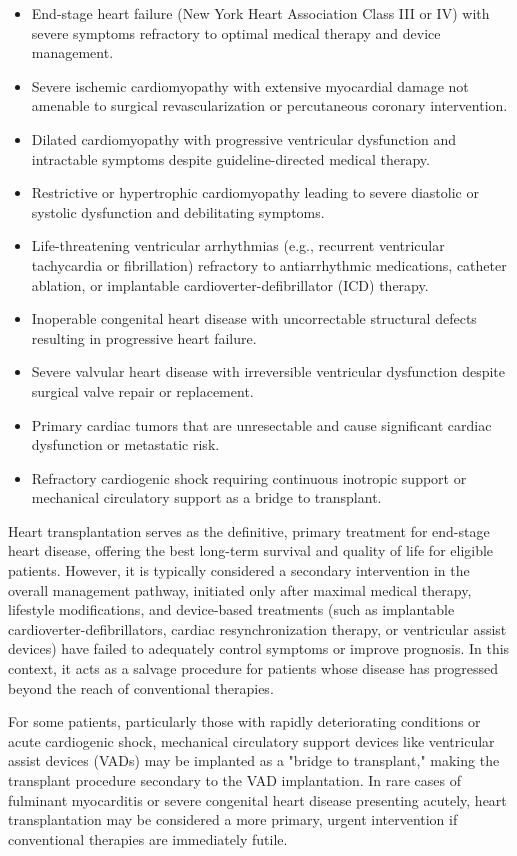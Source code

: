 \begin{itemize}
  \item End-stage heart failure (New York Heart Association Class III or IV) with severe symptoms refractory to optimal medical therapy and device management.
  \item Severe ischemic cardiomyopathy with extensive myocardial damage not amenable to surgical revascularization or percutaneous coronary intervention.
  \item Dilated cardiomyopathy with progressive ventricular dysfunction and intractable symptoms despite guideline-directed medical therapy.
  \item Restrictive or hypertrophic cardiomyopathy leading to severe diastolic or systolic dysfunction and debilitating symptoms.
  \item Life-threatening ventricular arrhythmias (e.g., recurrent ventricular tachycardia or fibrillation) refractory to antiarrhythmic medications, catheter ablation, or implantable cardioverter-defibrillator (ICD) therapy.
  \item Inoperable congenital heart disease with uncorrectable structural defects resulting in progressive heart failure.
  \item Severe valvular heart disease with irreversible ventricular dysfunction despite surgical valve repair or replacement.
  \item Primary cardiac tumors that are unresectable and cause significant cardiac dysfunction or metastatic risk.
  \item Refractory cardiogenic shock requiring continuous inotropic support or mechanical circulatory support as a bridge to transplant.
\end{itemize}

Heart transplantation serves as the definitive, primary treatment for end-stage heart disease, offering the best long-term survival and quality of life for eligible patients. However, it is typically considered a secondary intervention in the overall management pathway, initiated only after maximal medical therapy, lifestyle modifications, and device-based treatments (such as implantable cardioverter-defibrillators, cardiac resynchronization therapy, or ventricular assist devices) have failed to adequately control symptoms or improve prognosis. In this context, it acts as a salvage procedure for patients whose disease has progressed beyond the reach of conventional therapies.

For some patients, particularly those with rapidly deteriorating conditions or acute cardiogenic shock, mechanical circulatory support devices like ventricular assist devices (VADs) may be implanted as a "bridge to transplant," making the transplant procedure secondary to the VAD implantation. In rare cases of fulminant myocarditis or severe congenital heart disease presenting acutely, heart transplantation may be considered a more primary, urgent intervention if conventional therapies are immediately futile.

